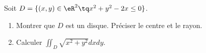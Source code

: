 
\begin{exercice}\label{exoOutilsMath-0106}

    Soit $D=\{ (x,y)\in \eR^2\tq x^2+y^2-2x\leq 0 \}$.
    \begin{enumerate}
        \item
            Montrer que $D$ est un disque. Préciser le centre et le rayon.
        \item
            Calculer $\iint_D\sqrt{x^2+y^2}dxdy$.
    \end{enumerate}

\end{exercice}
